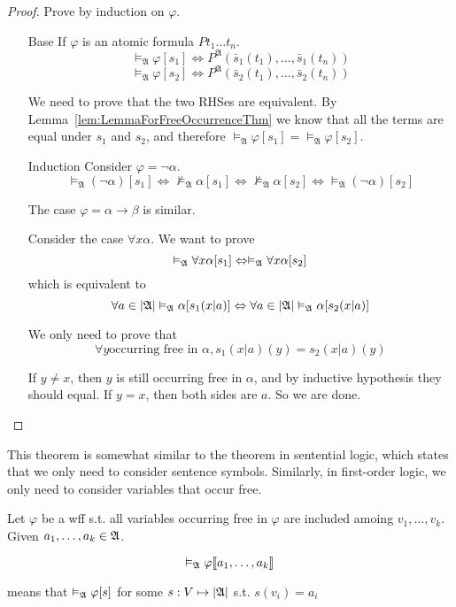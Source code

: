 \begin{proof}
    Prove by induction on $\varphi$.
    \begin{itemize}
        \item[Base] If $\varphi$ is an atomic formula $Pt_1\dots t_n$.
        \[ \vDash_{\mathfrak{A}} \varphi [s_1] \Leftrightarrow P^{\mathfrak{A}}(\bar{s}_1(t_1),\dots,\bar{s}_1(t_n)) \]
        \[ \vDash_{\mathfrak{A}} \varphi [s_2] \Leftrightarrow P^{\mathfrak{A}}(\bar{s}_2(t_1),\dots,\bar{s}_2(t_n)) \]

        We need to prove that the two RHSes are equivalent. By Lemma~\ref{lem:LemmaForFreeOccurrenceThm} we know that all the terms are equal under $s_1$ and $s_2$, and therefore $\vDash_{\mathfrak{A}} \varphi [s_1] = \vDash_{\mathfrak{A}} \varphi [s_2]$.

        \item[Induction] Consider $\varphi=\neg\alpha$.
        \[ \vDash_{\mathfrak{A}}(\neg\alpha)[s_1] \Leftrightarrow \nvDash_{\mathfrak{A}}\alpha[s_1] \Leftrightarrow \nvDash_{\mathfrak{A}}\alpha[s_2] \Leftrightarrow \vDash_{\mathfrak{A}}(\neg\alpha)[s_2] \]

        The case $\varphi = \alpha\to\beta$ is similar.

        Consider the case $\forall x \alpha$. We want to prove
        \[ \vDash_{\mathfrak{A}}\forall x\alpha[s_1] \Leftrightarrow \vDash_{\mathfrak{A}}\forall x\alpha[s_2] \]
        which is equivalent to
        \[ \forall a\in|\mathfrak{A}|\vDash_{\mathfrak{A}}\alpha[s_1(x|a)] \Leftrightarrow \forall a \in |\mathfrak{A}| \vDash_{\mathfrak{A}}\alpha[s_2(x|a)] \]

        We only need to prove that
        \[ \forall y \text{occurring free in $\alpha$}, s_1(x|a)(y) = s_2(x|a)(y) \]

        If $y\neq x$, then $y$ is still occurring free in $\alpha$, and by inductive hypothesis they should equal. If $y=x$, then both sides are $a$. So we are done.
    \end{itemize}
\end{proof}
\begin{remark}
    This theorem is somewhat similar to the theorem in sentential logic, which states that we only need to consider sentence symbols. Similarly, in first-order logic, we only need to consider variables that occur free.
\end{remark}

\begin{definition}
    Let $\varphi$ be a wff s.t. all variables occurring free in $\varphi$ are included amoing $v_1,\dots,v_k$. Given $a_1,\dots,a_k\in\mathfrak{A}$.

    \[ \vDash_{\mathfrak{A}}\varphi\llbracket a_1,\dots,a_k \rrbracket \]

    means that $\vDash_{\mathfrak{A}}\varphi[s]$ for some $s:V\mapsto|\mathfrak{A}|$ s.t. $s(v_i) = a_i$
\end{definition}

